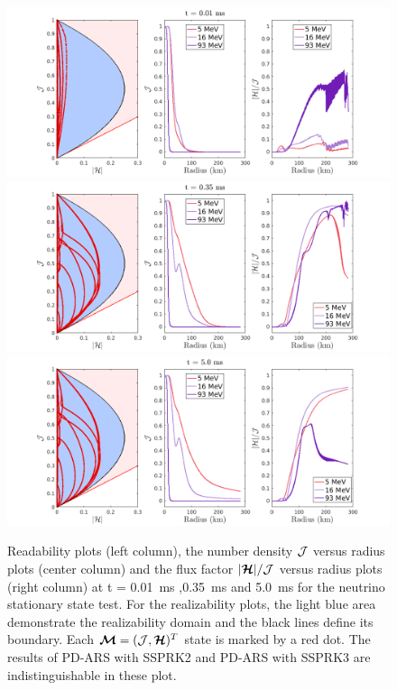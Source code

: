\begin{figure}[h]
  \centering
    \includegraphics[width=\textwidth]{figures/NSS_1_1}\\
    \includegraphics[width=\textwidth]{figures/NSS_3_1} \\
    \includegraphics[width=\textwidth]{figures/NSS_5_1} \\
   \caption{Readability plots (left column), the number density $\mathcal{J}$ versus radius plots (center column) and the flux factor $|\boldsymbol{\mathcal{H}}|/\mathcal{J}$ versus radius plots (right column) at t = 0.01~ms ,0.35~ms and 5.0~ms for the neutrino stationary state test. For the realizability plots, the light blue area demonstrate the realizability domain and the black lines define its boundary. Each $\boldsymbol{\mathcal{M}}=(\mathcal{J},\boldsymbol{\mathcal{H}})^{T}$ state is marked by a red dot. The results of PD-ARS with SSPRK2 and PD-ARS with SSPRK3 are indistinguishable in these plot.}
      \label{fig:NeutrinoStationaryTestEvolve}
\end{figure}